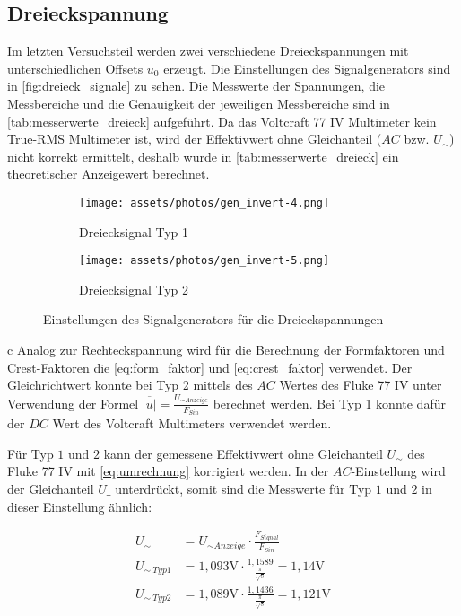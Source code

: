 \subsection{Dreieckspannung}

Im letzten Versuchsteil werden zwei verschiedene Dreieckspannungen mit unterschiedlichen Offsets $u_0$ erzeugt. Die Einstellungen des Signalgenerators sind in \autoref{fig:dreieck_signale} zu sehen. Die Messwerte der Spannungen, die Messbereiche und die Genauigkeit der jeweiligen Messbereiche sind in \autoref{tab:messerwerte_dreieck} aufgeführt. Da das Voltcraft 77 IV Multimeter kein True-RMS Multimeter ist, wird der Effektivwert ohne Gleichanteil ($AC$ bzw. $U_\sim$) nicht korrekt ermittelt, deshalb wurde in \autoref{tab:messerwerte_dreieck} ein theoretischer Anzeigewert berechnet.

\begin{figure}[h]
    \centering
    \begin{subfigure}{0.4\textwidth}
        \centering
        \texttt{[image: assets/photos/gen\_invert-4.png]}
        \caption{Dreiecksignal Typ 1}
        \label{fig:dreieck_signal_t2}
    \end{subfigure}
    \hspace{0.5cm}
    \begin{subfigure}{0.4\textwidth}
        \centering
        \texttt{[image: assets/photos/gen\_invert-5.png]}
        \caption{Dreiecksignal Typ 2}
        \label{fig:dreieck_signal_t1}
    \end{subfigure}
    \caption{Einstellungen des Signalgenerators für die Dreieckspannungen}
    \label{fig:dreieck_signale}
\end{figure}


c
Analog zur Rechteckspannung wird für die Berechnung der Formfaktoren und Crest-Faktoren die \autoref{eq:form_faktor} und \autoref{eq:crest_faktor} verwendet. Der Gleichrichtwert konnte bei Typ 2 mittels des $AC$ Wertes des Fluke 77 IV unter Verwendung der Formel $\overline{|u|} = \frac{U_{\sim Anzeige}}{F_{Sin}}$ berechnet werden. Bei Typ 1 konnte dafür der $DC$ Wert des Voltcraft Multimeters verwendet werden.

Für Typ $1$ und $2$ kann der gemessene Effektivwert ohne Gleichanteil $U_\sim$ des Fluke 77 IV mit \autoref{eq:umrechnung} korrigiert werden. In der $AC$-Einstellung wird der Gleichanteil $U\_$ unterdrückt, somit sind die Messwerte für Typ $1$ und $2$ in dieser Einstellung ähnlich:

\begin{equation}
    \begin{aligned}
        U_{\sim}         & = U_{\sim Anzeige} \cdot \frac{F_{Signal}}{F_{Sin}}                             \\
        U_{\sim \ Typ 1} & = 1,093 \si{\volt} \cdot \frac{1,1589}{\frac{\pi}{\sqrt{8}}} = 1,14 \si{\volt}  \\
        U_{\sim \ Typ 2} & = 1,089 \si{\volt} \cdot \frac{1,1436}{\frac{\pi}{\sqrt{8}}} = 1,121 \si{\volt}
    \end{aligned}
\end{equation}


